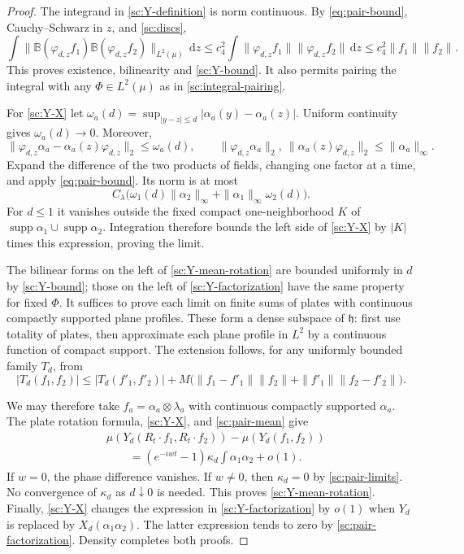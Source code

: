 \documentclass[11pt,letterpaper,reqno]{amsart}
\theoremstyle{definition}
\theoremstyle{remark}
\begin{document}
\begin{proof}
The integrand in \eqref{sc:Y-definition} is norm continuous. By
\eqref{eq:pair-bound}, Cauchy--Schwarz in $z$, and
\eqref{sc:discs},
\[
\int\|\mathbb B(\varphi_{d,z}f_1)
             \mathbb B(\varphi_{d,z}f_2)\|_{L^2(\mu)}\,\mathrm dz
 \le c_4^2\int\|\varphi_{d,z}f_1\|\|\varphi_{d,z}f_2\|\,\mathrm dz
 \le c_4^2\|f_1\|\|f_2\|.
\]
This proves existence, bilinearity and \eqref{sc:Y-bound}. It also permits
pairing the integral with any $\Phi\in L^2(\mu)$ as in
\eqref{sc:integral-pairing}.

For \eqref{sc:Y-X} let
$\omega_a(d)=\sup_{|y-z|\le d}|\alpha_a(y)-\alpha_a(z)|$.
Uniform continuity gives $\omega_a(d)\to0$. Moreover,
\[
\|\varphi_{d,z}\alpha_a-\alpha_a(z)\varphi_{d,z}\|_2\le\omega_a(d),
\qquad
\|\varphi_{d,z}\alpha_a\|_2,
\ \|\alpha_a(z)\varphi_{d,z}\|_2\le\|\alpha_a\|_\infty.
\]
Expand the difference of the two products of fields, changing one factor
at a time, and apply \eqref{eq:pair-bound}. Its norm is at most
\[
C_\lambda\bigl(\omega_1(d)\|\alpha_2\|_\infty
             +\|\alpha_1\|_\infty\omega_2(d)\bigr).
\]
For $d\le1$ it vanishes outside the fixed compact one-neighborhood $K$
of $\operatorname{supp}\alpha_1\cup\operatorname{supp}\alpha_2$.
Integration therefore bounds the left side of \eqref{sc:Y-X} by $|K|$
times this expression, proving the limit.

The bilinear forms on the left of \eqref{sc:Y-mean-rotation} are bounded
uniformly in $d$ by \eqref{sc:Y-bound}; those on the left of
\eqref{sc:Y-factorization} have the same property for fixed $\Phi$.
It suffices to prove each limit on finite sums of plates with continuous
compactly supported plane profiles. These form a dense subspace of
$\mathfrak h$: first use totality of plates, then approximate each plane
profile in $L^2$ by a continuous function of compact support.
The extension follows, for any uniformly bounded family $T_d$, from
\[
|T_d(f_1,f_2)|\le |T_d(f'_1,f'_2)|
 +M\bigl(\|f_1-f'_1\|\|f_2\|+\|f'_1\|\|f_2-f'_2\|\bigr).
\]

We may therefore take $f_a=\alpha_a\otimes\lambda_a$ with continuous
compactly supported $\alpha_a$. The plate rotation formula,
\eqref{sc:Y-X}, and \eqref{sc:pair-mean} give
\[
\begin{split}
&\mu(Y_d(R_t\cdot f_1,R_t\cdot f_2))-\mu(Y_d(f_1,f_2))\\
&\qquad=(e^{-iwt}-1)\kappa_d\int\alpha_1\alpha_2+o(1).
\end{split}
\]
If $w=0$, the phase difference vanishes. If $w\ne0$, then
$\kappa_d=0$ by \cref{sc:pair-limits}. No convergence of
$\kappa_d$ as $d\downarrow0$ is needed. This proves
\eqref{sc:Y-mean-rotation}. Finally, \eqref{sc:Y-X} changes the expression
in \eqref{sc:Y-factorization} by $o(1)$ when $Y_d$ is replaced by
$X_d(\alpha_1\alpha_2)$. The latter expression tends to zero by
\eqref{sc:pair-factorization}. Density completes both proofs.
\end{proof}
\end{document}
